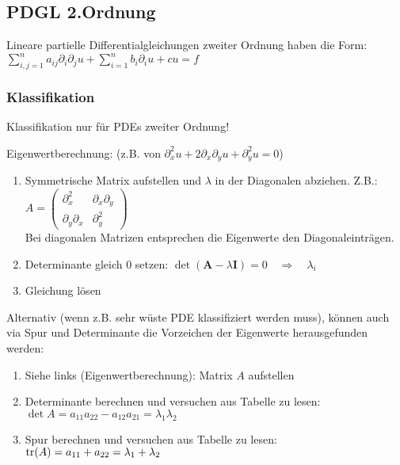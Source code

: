 \subsection{PDGL 2.Ordnung}
Lineare partielle Differentialgleichungen zweiter Ordnung haben die Form:
$\boxed{\sum\limits_{i,j=1}^{n}{a_{ij}\partial_i\partial_j u}+\sum\limits_{i=1}^{n}{b_i\partial_i u}+cu=f}$

\subsubsection{Klassifikation}
Klassifikation nur für PDEs zweiter Ordnung!

\begin{minipage}{9cm}
  Eigenwertberechnung: (z.B. von $ \partial^2_xu+2\partial_x\partial_yu+\partial^2_yu=0 $) 
  \begin{enumerate}
    \item Symmetrische Matrix aufstellen und $\lambda$ in der Diagonalen abziehen. Z.B.: $A = \begin{pmatrix}
      \partial_x^2 & \partial_x \partial_y \\
      \partial_y \partial_x  & \partial_y^2
    \end{pmatrix}$\\
    Bei diagonalen Matrizen entsprechen die Eigenwerte den Diagonaleinträgen.
    \item Determinante gleich 0 setzen: $\det(\mathbf{A}-\lambda \mathbf{I}) = 0\quad\Rightarrow\quad \lambda_i$
    \item Gleichung lösen
  \end{enumerate}
\end{minipage}
\begin{minipage}{9cm}
  Alternativ (wenn z.B. sehr wüste PDE klassifiziert werden muss), können auch via Spur und Determinante die Vorzeichen der Eigenwerte herausgefunden werden:
  \begin{enumerate}
    \item Siehe links (Eigenwertberechnung): Matrix $A$ aufstellen
    \item Determinante berechnen und versuchen aus Tabelle zu lesen:
     $\det A = a_{11}a_{22} - a_{12}a_{21} = \lambda_1 \lambda_2$
    \item Spur berechnen und versuchen aus Tabelle zu lesen:
      $\operatorname{tr}(A) = a_{11} + a_{22} = \lambda_1 + \lambda_2$
  \end{enumerate}
  
\end{minipage}

